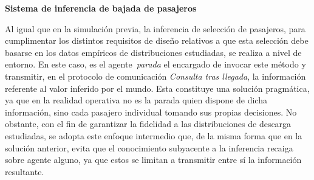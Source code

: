 \medskip
\noindent\textbf{Sistema de inferencia de bajada de pasajeros}

Al igual que en la simulación previa, la inferencia de selección de pasajeros, para cumplimentar los distintos requisitos de diseño
relativos a que esta selección debe basarse en los datos empíricos de distribuciones estudiadas, se realiza a nivel de entorno.
En este caso, es el agente~\textit{parada} el encargado de invocar este método y transmitir, en el protocolo de comunicación
\textit{Consulta tras llegada}, la información referente al valor inferido por el mundo. Esta constituye una solución pragmática, ya que
en la realidad operativa no es la parada quien dispone de dicha información, sino cada pasajero individual tomando sus propias decisiones.
No obstante, con el fin de garantizar la fidelidad a las distribuciones de descarga estudiadas, se adopta este enfoque intermedio que, de
la misma forma que en la solución anterior, evita que el conocimiento subyacente a la inferencia recaiga sobre agente alguno, ya que
estos se limitan a transmitir entre sí la información resultante.